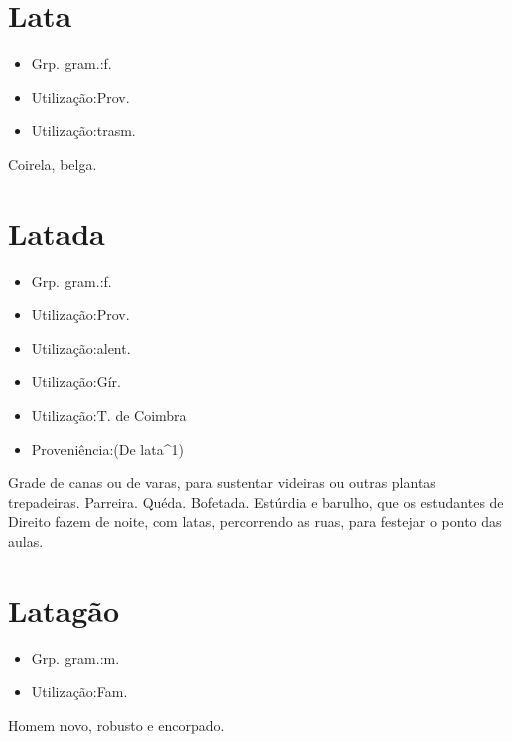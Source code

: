 \section{Lata}
\begin{itemize}
\item {Grp. gram.:f.}
\end{itemize}
\begin{itemize}
\item {Utilização:Prov.}
\end{itemize}
\begin{itemize}
\item {Utilização:trasm.}
\end{itemize}
Coirela, belga.
\section{Latada}
\begin{itemize}
\item {Grp. gram.:f.}
\end{itemize}
\begin{itemize}
\item {Utilização:Prov.}
\end{itemize}
\begin{itemize}
\item {Utilização:alent.}
\end{itemize}
\begin{itemize}
\item {Utilização:Gír.}
\end{itemize}
\begin{itemize}
\item {Utilização:T. de Coimbra}
\end{itemize}
\begin{itemize}
\item {Proveniência:(De \textunderscore lata\textunderscore ^1)}
\end{itemize}
Grade de canas ou de varas, para sustentar videiras ou outras plantas trepadeiras.
Parreira.
Quéda.
Bofetada.
Estúrdia e barulho, que os estudantes de Direito fazem de noite, com latas, percorrendo as ruas, para festejar o ponto das aulas.
\section{Latagão}
\begin{itemize}
\item {Grp. gram.:m.}
\end{itemize}
\begin{itemize}
\item {Utilização:Fam.}
\end{itemize}
Homem novo, robusto e encorpado.
